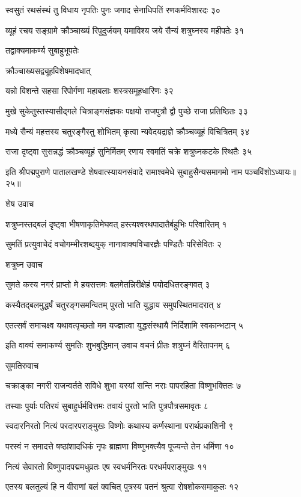 स्वसुतं रथसंस्थं तु विधाय नृपतिः पुनः
जगाद सेनाधिपतिं रणकर्मविशारदः ३०

व्यूहं रचय सङ्ग्रामे क्रौञ्चाख्यं रिपुदुर्जयम्
यमाविश्य जये सैन्यं शत्रुघ्नस्य महीपतेः ३१

तद्वाक्यमाकर्ण्य सुबाहुभूपतेः

क्रौञ्चाख्यसद्व्यूहविशेषमादधात्

यन्नो विशन्ते सहसा रिपोर्गणा
महाबलाः शस्त्रसमूहधारिणः ३२

मुखे सुकेतुस्तस्यासीद्गले चित्राङ्गसंज्ञकः
पक्षयो राजपुत्रौ द्वौ पुच्छे राजा प्रतिष्ठितः ३३

मध्ये सैन्यं महत्तस्य चतुरङ्गैस्तु शोभितम्
कृत्वा न्यवेदयद्राज्ञे क्रौञ्चव्यूहं विचित्रितम् ३४

राजा दृष्ट्वा सुसन्नद्धं क्रौञ्चव्यूहं सुनिर्मितम्
रणाय स्वमतिं चक्रे शत्रुघ्नकटके स्थितैः ३५

इति श्रीपद्मपुराणे पातालखण्डे शेषवात्स्यायनसंवादे रामाश्वमेधे सुबाहुसैन्यसमागमो नाम पञ्चविंशोऽध्यायः॥२५॥


शेष उवाच

शत्रुघ्नस्तद्बलं दृष्ट्वा भीषणाकृतिमेघवत्
हस्त्यश्वरथपादातैर्बहुभिः परिवारितम् १

सुमतिं प्रत्युवाचेदं वचोगम्भीरशब्दयुक्
नानावाक्यविचारज्ञैः पण्डितैः परिसेवितः २

शत्रुघ्न उवाच

सुमते कस्य नगरं प्राप्तो मे हयसत्तमः
बलमेतन्निरीक्षेहं पयोदधितरङ्गवत् ३

कस्यैतद्बलमुद्धर्षं चतुरङ्गसमन्वितम्
पुरतो भाति युद्धाय समुपस्थितमादरात् ४

एतत्सर्वं समाचक्ष्व यथावत्पृच्छतो मम
यज्ज्ञात्वा युद्धसंस्थायै निर्दिशामि स्वकान्भटान् ५

इति वाक्यं समाकर्ण्य सुमतिः शुभबुद्धिमान्
उवाच वचनं प्रीतः शत्रुघ्नं वैरितापनम् ६

सुमतिरुवाच

चक्राङ्का नगरी राजन्वर्तते सविधे शुभा
यस्यां सन्ति नराः पापरहिता विष्णुभक्तितः ७

तस्याः पुर्याः पतिरयं सुबाहुर्धर्मवित्तमः
तवायं पुरतो भाति पुत्रपौत्रसमावृतः ८

स्वदारनिरतो नित्यं परदारपराङ्मुखः
विष्णोः कथास्य कर्णस्थाना परार्थप्रकाशिनी ९

परस्वं न समादत्ते षष्ठांशादधिकं नृपः
ब्राह्मणा विष्णुभक्त्यैव पूज्यन्ते तेन धर्मिणा १०

नित्यं सेवारतो विष्णुपादपद्ममधुव्रतः
एष स्वधर्मनिरतः परधर्मपराङ्मुखः ११

एतस्य बलतुल्यं हि न वीराणां बलं क्वचित्
पुत्रस्य पतनं श्रुत्वा रोषशोकसमाकुलः १२


